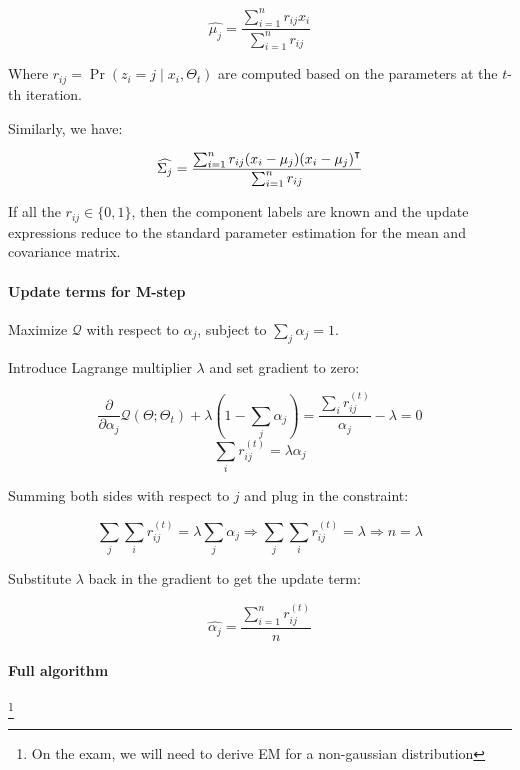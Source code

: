 \documentclass{idc_msc}
\renewcommand{\T}{{\mathpalette\raiseT\intercal}} %
\begin{document}
\[\widehat{\mu_j} = \frac{\sum_{i=1}^n r_{ij} x_i}{\sum_{i=1}^n r_{ij}}\]

Where \(r_{ij} = \Pr(z_i = j \mid x_i, \Theta_t)\) are computed based on the parameters at the \(t\)-th iteration.

Similarly, we have:

\[\widehat{\Sigma_j} = \frac{\sum_{i=1}^n r_{ij} (x_i - \mu_j)(x_i - \mu_j)^\T}{\sum_{i=1}^n r_{ij}}\]

If all the \(r_{ij} \in \{0,1\}\), then the component labels are known and the update expressions reduce to the standard parameter estimation for the mean and covariance matrix.

\paragraph{Update terms for M-step}

Maximize \(\mathcal{Q}\) with respect to \(\alpha_j\), subject to \(\sum_j \alpha_j = 1\).

Introduce Lagrange multiplier \(\lambda\) and set gradient to zero:

\[
  \frac{\partial}{\partial \alpha_j} \mathcal{Q}(\Theta; \Theta_t) + \lambda (1 - \sum_j \alpha_j) = \frac{\sum_i r_{ij}^{(t)}}{\alpha_j} - \lambda = 0
\]
\[\sum_i r_{ij}^{(t)} = \lambda \alpha_j\]

Summing both sides with respect to \(j\) and plug in the constraint:

\[\sum_j \sum_i r_{ij}^{(t)} = \lambda \sum_j \alpha_j \Rightarrow \sum_j \sum_i r_{ij}^{(t)} = \lambda \Rightarrow n = \lambda\]

Substitute \(\lambda\) back in the gradient to get the update term:

\[\widehat{\alpha_j} = \frac{\sum_{i=1}^n r_{ij}^{(t)}}{n}\]

\paragraph{Full algorithm}
\footnote{On the exam, we will need to derive EM for a non-gaussian distribution} %
\end{document}
